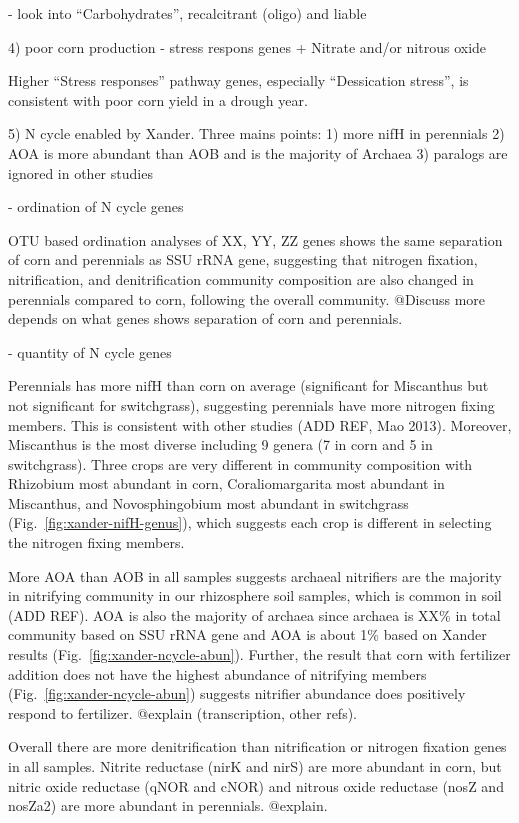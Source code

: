 \documentclass[12pt]{article}
\begin{document}
- look into ``Carbohydrates'', recalcitrant (oligo) and liable

4) poor corn production - stress respons genes + Nitrate and/or nitrous oxide

Higher ``Stress responses'' pathway genes, especially ``Dessication stress'', is consistent with poor corn yield in a drough year.

5) N cycle enabled by Xander. Three mains points: 1) more nifH in perennials 2) AOA is more abundant than AOB and is the majority of Archaea 3) paralogs are ignored in other studies

- ordination of N cycle genes

OTU based ordination analyses of XX, YY, ZZ genes shows the same separation of corn and perennials as SSU rRNA gene, suggesting that nitrogen fixation, nitrification, and denitrification community composition are also changed in perennials compared to corn, following the overall community. @Discuss more depends on what genes shows separation of corn and perennials.

- quantity of N cycle genes

Perennials has more nifH than corn on average (significant for Miscanthus but not significant for switchgrass), suggesting perennials have more nitrogen fixing members. This is consistent with other studies (ADD REF, Mao 2013). Moreover, Miscanthus is the most diverse including 9 genera (7 in corn and 5 in switchgrass). Three crops are very different in community composition with Rhizobium most abundant in corn, Coraliomargarita most abundant in Miscanthus, and Novosphingobium most abundant in switchgrass (Fig.~\ref{fig:xander-nifH-genus}), which suggests each crop is different in selecting the nitrogen fixing members.

More AOA than AOB in all samples suggests archaeal nitrifiers are the majority in nitrifying community in our rhizosphere soil samples, which is common in soil (ADD REF). AOA is also the majority of archaea since archaea is XX\% in total community based on SSU rRNA gene and AOA is about 1\% based on Xander results (Fig.~\ref{fig:xander-ncycle-abun}). Further, the result that corn with fertilizer addition does not have the highest abundance of nitrifying members (Fig.~\ref{fig:xander-ncycle-abun}) suggests nitrifier abundance does positively respond to fertilizer. @explain (transcription, other refs).

Overall there are more denitrification than nitrification or nitrogen fixation genes in all samples. Nitrite reductase (nirK and nirS) are more abundant in corn, but nitric oxide reductase (qNOR and cNOR) and nitrous oxide reductase (nosZ and nosZa2) are more abundant in perennials. @explain. 
\end{document}
